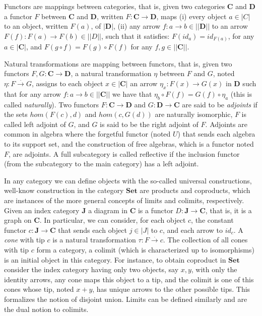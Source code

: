 Functors are mappings between categories, that is, given two categories $\mathbf{C}$ and $\mathbf{D}$ a functor $F$ between $\mathbf{C}$ and $\mathbf{D}$, written $F:\mathbf{C} \rightarrow \mathbf{D}$,  maps (i) every object $a \in |C|$ to an object, written $F(a)$, of $|\mathbf{D}|$, (ii) any arrow $f:a \rightarrow b \in || \mathbf{D} ||$ to an arrow $F(f) : F(a) \rightarrow F(b) \in || D||$, such that it satisfies: $F(id_a) = id_{F(a)}$, for any $a \in | \mathbf{C} |$, and $F(g \circ f) = F(g) \circ F(f)$ for any $f,g \in ||\mathbf{C} ||$.  

Natural transformations are mapping between functors, that is, given two functors $F, G: \mathbf{C} \rightarrow \mathbf{D}$, a natural transformation $\eta$ between $F$ and $G$, noted $\eta : F \xrightarrow{.} G$,  assigns to each object $x \in |\mathbf{C}|$ an arrow $\eta_x : F(x) \rightarrow G(x)$ in $\mathbf{D}$ such that for any arrow $f:a \rightarrow b \in || \mathbf{C}||$ we have that $\eta_b \circ F(f) = G(f) \circ \eta_a$ (this is called \emph{naturally}).  Two functors $F: \mathbf{C} \rightarrow \mathbf{D}$ and $G: \mathbf{D} \rightarrow \mathbf{C}$ are said to be \emph{adjoints} if the sets $\mathit{hom}(F(c),d)$ and $\mathit{hom}(c, G(d))$ are naturally isomorphic, $F$ is called left adjoint of $G$, and $G$ is said to be the right adjoint of $F$.  Adjoints  are common in algebra where the forgetful functor (noted $U$) that sends each algebra to its support set, and the construction of free algebras, which is a functor noted $F$, are adjoints.  A full subcategory is called reflective if the inclusion functor (from the subcategory to the main category) has a left adjoint. 

In any category we can define objects with the so-called universal constructions,  well-know construction in the category $\mathbf{Set}$ are products and coproducts,  which are instances of the more general concepts of  limits and colimits, respectively.    Given an index category $\mathbf{J}$ a diagram in $\mathbf{C}$ is a functor $D: \mathbf{J} \rightarrow \mathbf{C}$, that is, it is a graph on $\mathbf{C}$.  In particular, we can consider, for each object $c$, the constant functor $c : \mathbf{J} \rightarrow \mathbf{C}$ that sends each object $j \in |J|$ to $c$, and each arrow to $id_c$.  A \emph{cone} with tip $c$ is a natural transformation 
$\tau : F \xrightarrow{.} c$. The collection of all cones with tip $c$ form a category,   a colimit (which is characterized up to isomorphisms) is an initial object in this category.  For instance, to obtain coproduct in $\mathbf{Set}$ consider the index category having only two objects, say $x,y$, with only the identity arrows,  any cone maps this object to a tip, and the colimit is one of this cones whose tip, noted $x+y$, has unique arrows to the other possible tips. This formalizes the notion of disjoint union. Limits can be defined similarly and are the dual notion to colimits.

